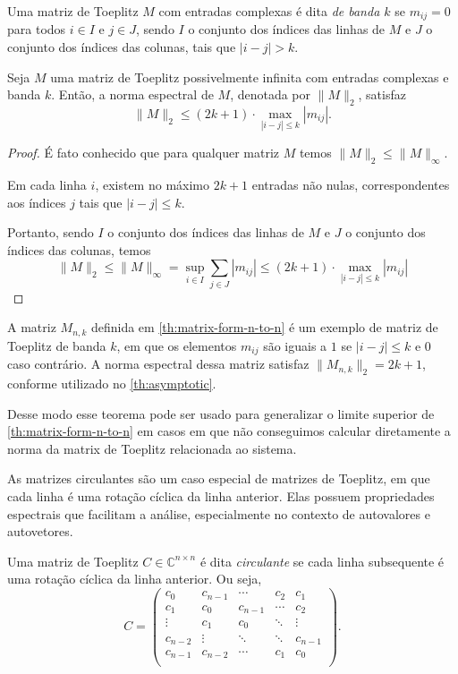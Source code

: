 \begin{definition*}
  Uma matriz de Toeplitz $ M $ com entradas complexas é dita \textit{de banda $ k $} se $ m_{ij} = 0 $ para todos $ i \in I$ e $j \in J $, sendo $I$ o conjunto dos índices das linhas de $M$ e $J$ o conjunto dos índices das colunas, tais que $ |i - j| > k $.
\end{definition*}

\begin{theorem*} Seja \( M \) uma matriz de Toeplitz possivelmente infinita com entradas complexas e banda \( k \). Então, a norma espectral de \( M \), denotada por \( \| M \|_2 \), satisfaz \[ \| M \|_2 \leq (2k + 1) \cdot \max_{|i - j| \leq k} |m_{ij}|. \] \end{theorem*}
\begin{proof}
É fato conhecido que para qualquer matriz $M$ temos $\| M \|_2 \leq \| M \|_\infty$.

Em cada linha $i$, existem no máximo $2k + 1$ entradas não nulas, correspondentes aos índices $j$ tais que $\lvert i - j \rvert \leq k$.

Portanto, sendo $I$ o conjunto dos índices das linhas de $M$ e $J$ o conjunto dos índices das colunas, temos \[ \| M \|_2 \le \| M \|_\infty = \sup_{i \in I} \sum_{j \in J} |m_{ij}| \leq (2k + 1) \cdot \max_{|i - j| \leq k} |m_{ij}| \]
\end{proof}

A matriz $ M_{n,k} $ definida em \ref{th:matrix-form-n-to-n} é um exemplo de matriz de Toeplitz de banda $ k $, em que os elementos $ m_{ij} $ são iguais a $ 1 $ se $ |i - j| \le k $ e $ 0 $ caso contrário. A norma espectral dessa matriz satisfaz $ \| M_{n,k} \|_2 = 2k + 1 $, conforme utilizado no \ref{th:asymptotic}.

Desse modo esse teorema pode ser usado para generalizar o limite superior de \ref{th:matrix-form-n-to-n} em casos em que não conseguimos calcular diretamente a norma da matrix de Toeplitz relacionada ao sistema.

As matrizes circulantes são um caso especial de matrizes de Toeplitz, em que cada linha é uma rotação cíclica da linha anterior. Elas possuem propriedades espectrais que facilitam a análise, especialmente no contexto de autovalores e autovetores.

\begin{definition*}
  Uma matriz de Toeplitz $ C \in \mathbb{C}^{n \times n} $ é dita \textit{circulante} se cada linha subsequente é uma rotação cíclica da linha anterior. Ou seja,
  \[
    C = \begin{pmatrix}
      c_0     & c_{n-1} & \cdots  & c_2    & c_1     \\
      c_1     & c_0     & c_{n-1} & \cdots & c_2     \\
      \vdots  & c_1     & c_0     & \ddots & \vdots  \\
      c_{n-2} & \vdots  & \ddots  & \ddots & c_{n-1} \\
      c_{n-1} & c_{n-2} & \cdots  & c_1    & c_0     \\
    \end{pmatrix}.
  \]
\end{definition*}

